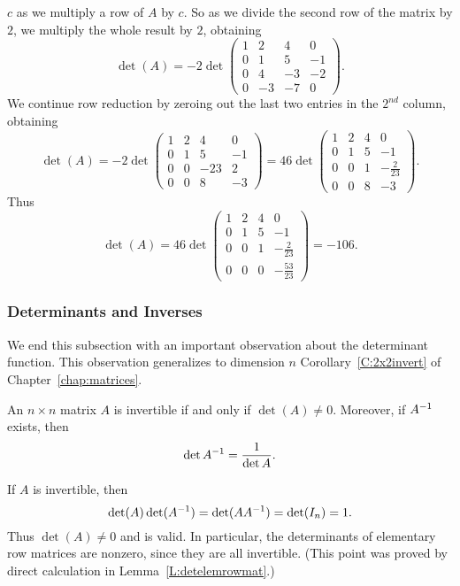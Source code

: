\documentclass{ximera}
\begin{document}
$c$ as we multiply a row of $A$ by $c$. So as we divide the second 
row of the matrix by $2$, we multiply the whole result by $2$, obtaining   
\[
\det(A) = -2\det\left(\begin{array}{rrrr} 1 & 2 & 4 & 0\\ 0 & 1 & 5 & -1 \\
0 & 4 & -3 & -2 \\ 0 & -3 & -7 & 0 \end{array}\right).
\] 
We continue row reduction by zeroing out the last two entries in
the $2^{nd}$ column, obtaining
\[
\det(A) = -2\det\left(\begin{array}{rrrr} 1 & 2 & 4 & 0\\ 0 & 1 & 5 & -1 \\
0 & 0 & -23 & 2 \\ 0 & 0 & 8 & -3 \end{array}\right)
= 46\det\left(\begin{array}{rrrr} 1 & 2 & 4 & 0\\ 0 & 1 & 5 & -1 \\
0 & 0 & 1 & -\frac{2}{23} \\ 0 & 0 & 8 & -3 \end{array}\right).
\] 
Thus
\[
\det(A) = 46\det\left(\begin{array}{rrrr} 1 & 2 & 4 & 0\\ 0 & 1 & 5 & -1 \\
0 & 0 & 1 & -\frac{2}{23} \\ 0 & 0 & 0 & -\frac{53}{23} \end{array}\right)
= -106.
\]  

\subsubsection*{Determinants and Inverses}

We end this subsection with an important observation about the
determinant function.  This observation generalizes to dimension
$n$ Corollary~\ref{C:2x2invert} of Chapter~\ref{chap:matrices}. 
\begin{thm}  \label{T:detandinv}
An $n\times n$ matrix $A$ is invertible if and only if $\det(A)\neq 0$.
Moreover, if $A^{-1}$ exists, then 
\begin{equation}  \label{E:detinv}
\det A^{-1} = \frac{1}{\det A}.
\end{equation}
\end{thm} 
 
\proof  If $A$ is invertible, then 
\[
\det(A)\det(A^{-1}) = \det(AA^{-1}) = \det(I_n) =1.
\]
Thus $\det(A)\neq 0$ and  is valid. In particular, the 
determinants of elementary row matrices are nonzero, since they are all
invertible. (This point was proved by direct calculation in
Lemma~\ref{L:detelemrowmat}.)
 
\end{document}
